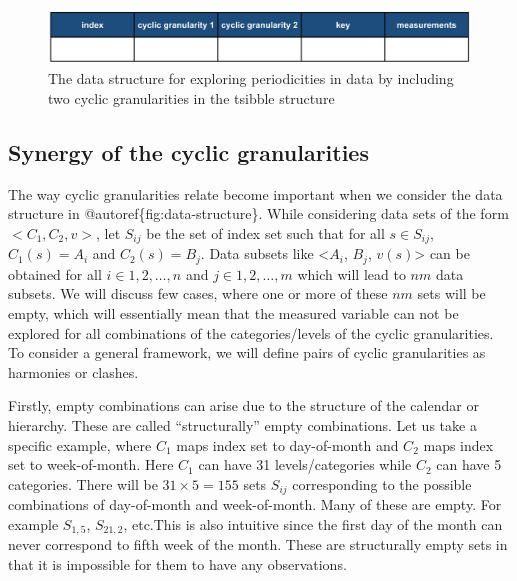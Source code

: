 \documentclass[12pt]{article}
\begin{document}
\begin{figure}[htb]

{\centering \includegraphics[width=\textwidth]{Figs/data-structure-v1} 

}

\caption{The data structure for exploring periodicities in data by including two cyclic granularities in the tsibble structure}\label{fig:data-structure}
\end{figure}

\hypertarget{sec:synergy}{%
\subsection{Synergy of the cyclic granularities}\label{sec:synergy}}

The way cyclic granularities relate become important when we consider the data structure in @autoref\{fig:data-structure\}. While considering data sets of the form \(<C_1, C_2, v>\), let \(S_{ij}\) be the set of index set such that for all \(s \in S_{ij}\), \(C_1(s) = A_i\) and \(C_2(s) = B_j\). Data subsets like \textless{}\(A_i\), \(B_j\), \(v(s)\)\textgreater{} can be obtained for all \(i \in {1, 2, \dots, n}\) and \(j \in {1, 2, \dots, m}\) which will lead to \(nm\) data subsets. We will discuss few cases, where one or more of these \(nm\) sets will be empty, which will essentially mean that the measured variable can not be explored for all combinations of the categories/levels of the cyclic granularities. To consider a general framework, we will define pairs of cyclic granularities as harmonies or clashes.

Firstly, empty combinations can arise due to the structure of the calendar or hierarchy.
These are called ``structurally'' empty combinations. Let us take a specific example, where \(C_1\) maps index set to day-of-month and \(C_2\) maps index set to week-of-month. Here \(C_1\) can have 31 levels/categories while \(C_2\) can have 5 categories. There will be \(31\times 5=155\) sets \(S_{ij}\) corresponding to the possible combinations of day-of-month and week-of-month. Many of these are empty. For example \(S_{1,5}\), \(S_{21,2}\), etc.This is also intuitive since the first day of the month can never correspond to fifth week of the month. These are structurally empty sets in that it is impossible for them to have any observations.
\end{document}
